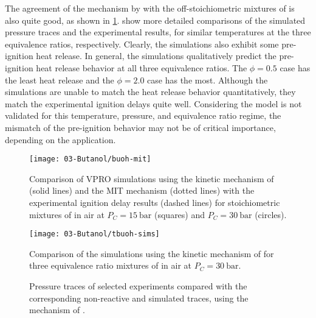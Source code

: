 \documentclass[../main.tex]{subfiles}
\begin{document}
The agreement of the mechanism by \textcite{Sarathy2012} with the
off-stoichiometric mixtures of \tBuOH{} is also quite good, as shown
in \cref{fig:tbuoh-sims}.  show more detailed comparisons
of the simulated pressure traces and the experimental results, for similar
temperatures at the three equivalence ratios, respectively. Clearly, the
simulations also exhibit some pre-ignition heat release. In general, the
simulations qualitatively predict the pre-ignition heat release behavior at all
three equivalence ratios. The $\phi=\num{0.5}$ case has the least heat release and
the $\phi=\num{2.0}$ case has the most. Although the simulations are unable to match
the heat release behavior quantitatively, they match the experimental ignition
delays quite well. Considering the model is not validated for this temperature,
pressure, and equivalence ratio regime, the mismatch of the pre-ignition
behavior may not be of critical importance, depending on the application.

\begin{figure}
    \begin{floatrow}
        \ffigbox
            {\texttt{[image: 03-Butanol/buoh-mit]}}
            {\caption{Comparison of VPRO simulations using the kinetic mechanism of
                \textcite{Sarathy2012} (solid lines) and the MIT mechanism
                \cite{Hansen2013,Merchant2013} (dotted lines) with the experimental
                ignition delay results (dashed lines) for stoichiometric mixtures of
                \iBuOH{} in air at $P_C=\SI{15}{\bar}$ (squares) and $P_C=\SI{30}{\bar}$
                (circles).}
            \label{fig:buoh-mit}}
        \ffigbox
            {\texttt{[image: 03-Butanol/tbuoh-sims]}}
            {\caption{Comparison of the simulations using the kinetic mechanism of
                \textcite{Sarathy2012} for three equivalence ratio mixtures of
                \tBuOH{} in air at $P_C=\SI{30}{\bar}$.}
            \label{fig:tbuoh-sims}}
    \end{floatrow}
\end{figure}

\begin{figure}
    {\caption{Pressure traces of selected
     \tBuOH{} experiments compared with the corresponding
     non-reactive and simulated traces, using the mechanism of
     \textcite{Sarathy2012}.}
    }
\end{figure}
\end{document}
